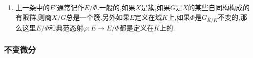 \begin{enumerate}
\begin{proof}
		每个$T\in\Phi$对应于$\overline{K}(E)$的一个自同构$\tau_T^*$.设$\overline{K}(E)^{\Phi}$是被$\Phi$中所有元固定的$\overline{K}(E)$的子域.那么Galois理论告诉我们$\overline{K}(E)$是$\overline{K}(E)^{\Phi}$的有限Galois扩张,并且Galois群同构于$\Phi$.又因为$\overline{K}\subseteq\overline{K}(E)$的超越维数是1,导致$\overline{K}\subseteq\overline{K}(E)^{\Phi}$的超越维数也是1,于是存在同构意义下唯一的$\overline{K}$上的光滑曲线$C$,以及一个有限态射$\varphi:E\to C$满足$\varphi^*\overline{K}(C)=\overline{K}(E)^{\varphi}$.我们断言$\varphi$是非分歧态射,一旦这成立,按照Hurwitz不等式,就得到$C$的亏格也是1,于是$C$是椭圆曲线,把$\varphi(O)$取为$C$的基点,这就得证.
		
		\qquad
		
		所以问题归结为证明$\varphi$是非分歧的.设$P\in E$和$T\in\Phi$,对任意$f\in\overline{K}(C)$,我们有:
		$$f(\varphi(P+T))=((\tau_T^*\circ\varphi^*)f)(P)=(\varphi^*f)(P)=f(\varphi(P))$$
		
		于是把$f$选取为坐标函数就导致$\varphi(P+T)=\varphi(P),\forall P\in E,T\in\Phi$.设$Q\in C$,选取$P\in E$满足$\varphi(P)=Q$,那么有$P+\Phi\subseteq\varphi^{-1}(Q)$.另一方面我们知道$|\varphi^{-1}(Q)|\le\deg\varphi=|\Phi|$,这个取等当且仅当$\varphi$是非分歧的.在$T$跑遍$\Phi$中的元时有$P+T$两两不同,所以$|\varphi^{-1}(Q)|\ge|\Phi|$,于是这实际上是等式,于是$\varphi$是非分歧的.
	\end{proof}
	\item 上一条中的$E'$通常记作$E/\Phi$.一般的,如果$X$是簇,如果$G$是$X$的某些自同构构成的有限群,则商$X/G$总是一个簇.另外如果$E$定义在域$K$上,如果$\Phi$是$G_{\overline{K}/K}$不变的,那么这里$E/\Phi$和典范态射$\varphi:E\to E/\Phi$都是定义在$K$上的.
\end{enumerate}
\subsubsection{不变微分}

